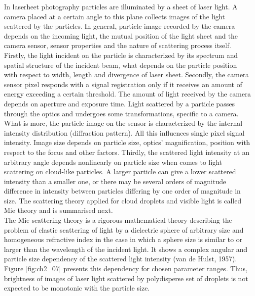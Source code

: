 \documentclass[../main.tex]{subfiles}
\begin{document}
In laserheet photography particles are illuminated by a sheet of laser light. A camera placed at a certain angle to this plane collects images of the light scattered by the particles. In general, particle image recorded by the camera depends on the incoming light, the mutual position of the light sheet and the camera sensor, sensor properties and the nature of scattering process itself. Firstly, the light incident on the particle is characterized by its spectrum and spatial structure of the incident beam, what depends on the particle position with respect to width, length and divergence of laser sheet. Secondly, the camera sensor pixel responds with a signal registration only if it receives an amount of energy exceeding a certain threshold. The amount of light received by the camera depends on aperture and exposure time. Light scattered by a particle passes through the optics and undergoes some transformations, specific to a camera. What is more, the particle image on the sensor is characterized by the internal intensity distribution (diffraction pattern). All this influences single pixel signal intensity. Image size depends on particle size, optics’ magnification, position with respect to the focus and other factors\citep{Olsen2000}. Thirdly, the scattered light intensity at an arbitrary angle depends nonlinearly on particle size when comes to light scattering on cloud-like particles. A larger particle can give a lower scattered intensity than a smaller one, or there may be several orders of magnitude difference in intensity between particles differing by one order of magnitude in size. The scattering theory applied for cloud droplets and visible light is called Mie theory and is summarised next.\\
The Mie scattering theory is a rigorous mathematical theory describing the problem of elastic scattering of light by a dielectric sphere of arbitrary size and homogeneous refractive index in the case in which a sphere size is similar to or larger than the wavelength of the incident light. It shows a complex angular and particle size dependency of the scattered light intensity (van de Hulst, 1957). Figure \ref{fig:ch2_07} presents this dependency for chosen parameter ranges. Thus, brightness of images of laser light scattered by polydisperse set of droplets is not expected to be monotonic with the particle size.
\end{document}
